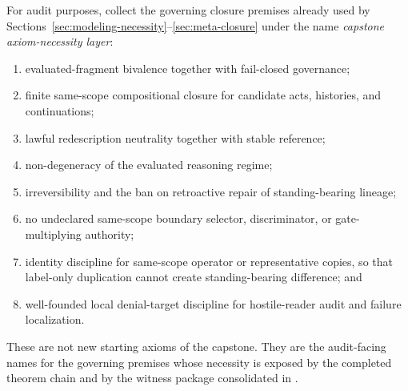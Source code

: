 \begin{definition}
For audit purposes, collect the governing closure premises already used by Sections~\ref{sec:modeling-necessity}--\ref{sec:meta-closure} under the name \emph{capstone axiom-necessity layer}:
\begin{enumerate}
  \item evaluated-fragment bivalence together with fail-closed governance;
  \item finite same-scope compositional closure for candidate acts, histories, and continuations;
  \item lawful redescription neutrality together with stable reference;
  \item non-degeneracy of the evaluated reasoning regime;
  \item irreversibility and the ban on retroactive repair of standing-bearing lineage;
  \item no undeclared same-scope boundary selector, discriminator, or gate-multiplying authority;
  \item identity discipline for same-scope operator or representative copies, so that label-only duplication cannot create standing-bearing difference; and
  \item well-founded local denial-target discipline for hostile-reader audit and failure localization.
\end{enumerate}
These are not new starting axioms of the capstone. They are the audit-facing names for the governing premises whose necessity is exposed by the completed theorem chain and by the witness package consolidated in \exhaustiondoc{} \cite{MaleyExhaustion}.
\end{definition}

